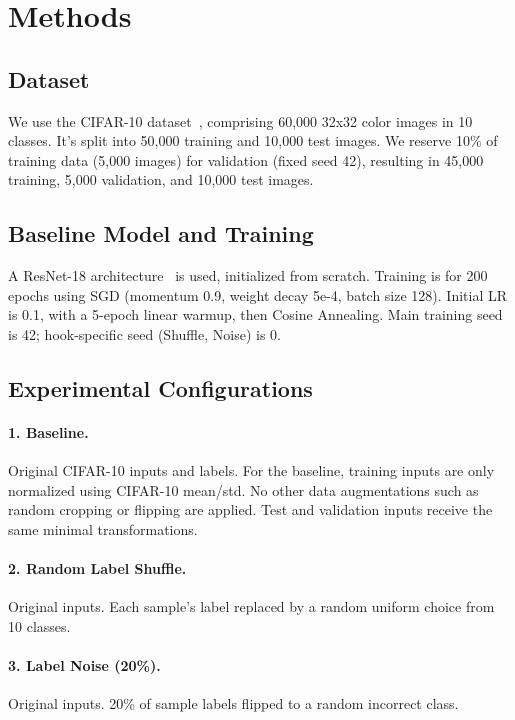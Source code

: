 \documentclass[10pt,twocolumn,letterpaper]{article}
\begin{document}
\section{Methods}
\label{sec:methods}

\subsection{Dataset}
We use the CIFAR-10 dataset~\cite{krizhevsky2009learning}, comprising 60,000 32x32 color images in 10 classes. It's split into 50,000 training and 10,000 test images. We reserve 10\% of training data (5,000 images) for validation (fixed seed 42), resulting in 45,000 training, 5,000 validation, and 10,000 test images.

\subsection{Baseline Model and Training}
A ResNet-18 architecture~\cite{DBLP:conf/cvpr/HeZRS16} is used, initialized from scratch.
Training is for 200 epochs using SGD (momentum 0.9, weight decay 5e-4, batch size 128). Initial LR is 0.1, with a 5-epoch linear warmup, then Cosine Annealing.
Main training seed is 42; hook-specific seed (Shuffle, Noise) is 0.

\subsection{Experimental Configurations}

\paragraph{1. Baseline.}
Original CIFAR-10 inputs and labels. For the baseline, training inputs are only normalized using CIFAR-10 mean/std. No other data augmentations such as random cropping or flipping are applied. Test and validation inputs receive the same minimal transformations.

\paragraph{2. Random Label Shuffle.}
Original inputs. Each sample's label replaced by a random uniform choice from 10 classes.

\paragraph{3. Label Noise (20\%).}
Original inputs. 20\% of sample labels flipped to a random incorrect class.
\end{document}
